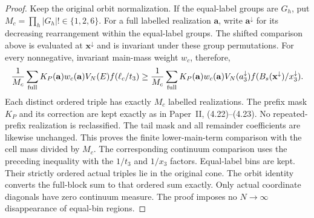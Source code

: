 \begin{proof}
Keep the original orbit normalization. If the equal-label groups are
$G_h$, put $M_c=\prod_h|G_h|!\in\{1,2,6\}$.
For a full labelled realization $\mathbf a$, write
$\mathbf a^\downarrow$ for its decreasing rearrangement within the
equal-label groups. The shifted comparison above is evaluated at
$\mathbf x^\downarrow$ and is invariant under these group permutations.
For every nonnegative, invariant main-mass weight $w_c$, therefore,
\[
 \frac1{M_c}\sum_{\rm full}K_P(\mathbf a)w_c(\mathbf a)
       V_N(E)f(\ell_c/t_3)
 \ge
 \frac1{M_c}\sum_{\rm full}K_P(\mathbf a)w_c(\mathbf a)
       V_N(a_3^\downarrow)
       f(B_s(\mathbf x^\downarrow)/x_3^\downarrow).
\]
Each distinct ordered triple has exactly $M_c$ labelled realizations.
The prefix mask $K_P$ and its correction are kept exactly as in
Paper~II, (4.22)--(4.23). No repeated-prefix realization is reclassified.
The tail mask and all remainder coefficients are likewise unchanged.
This proves the finite lower-main-term comparison with the cell mass
divided by $M_c$. The corresponding continuum comparison uses the
preceding inequality with the $1/t_3$ and $1/x_3$ factors.
Equal-label bins are kept. Their strictly ordered actual
triples lie in the original cone. The orbit identity converts
the full-block sum to that ordered sum exactly.
Only actual coordinate diagonals have zero continuum measure.
The proof imposes no $N\to\infty$ disappearance of equal-bin regions.
\end{proof}

